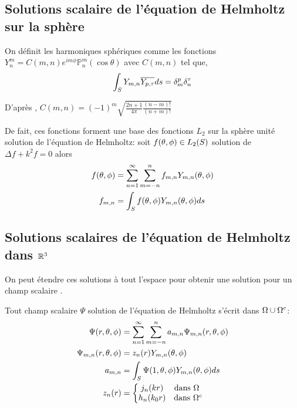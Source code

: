 \subsection{Solutions scalaire de l'équation de Helmholtz sur la sphère}

On définit les harmoniques sphériques comme les fonctions $Y_n^m = C(m,n) e^{im\phi}\mathbb{P}^m_n(\cos \theta) $ avec $C(m,n)$ tel que,
\[
 \displaystyle\int_S Y_{m,n} {\overline{Y_{p,\tau}}} ds = \delta_m^p \delta_n^\tau
\]

D’après \cite[p.~24]{nedelec_acoustic_2001}, $ C(m,n) = (-1)^m\sqrt{\frac{2n+1}{4\pi}\frac{(n-m)!}{(n+m)!}}$

De fait, ces fonctions forment une base des fonctions $L_2$ sur la sphère unité solution de l'équation de Helmholtz: soit $f(\theta,\phi) \in L_2(S)$ solution de $ \Delta f + k^2 f = 0 $ alors
  \begin{align}
    f(\theta,\phi) &= \sum\limits_{n=1}^\infty\sum\limits_{m=-n}^n f_{m,n} Y_{m,n} (\theta,\phi)\\
    \notag f_{m,n} &= \int_S f(\theta,\phi) Y_{m,n}(\theta,\phi) ds
  \end{align}


\subsection{Solutions scalaires de l'équation de Helmholtz dans $\mathbb R^3$}
On peut étendre ces solutions à tout l'espace pour obtenir une solution pour un champ scalaire .

Tout champ scalaire $\Psi$ solution de l'équation de Helmholtz s'écrit dans $\Omega\cup\Omega^c$:
\begin{align} 
\label{eq_helm_sol_helmoltz_scal_somme}
\Psi(r,\theta,\phi) &= \sum\limits_{n=1}^\infty\sum\limits_{m=-n}^n a_{m,n} \Psi_{m,n}(r,\theta,\phi) \\
\Psi_{m,n}(r,\theta,\phi) &= z_n(r) Y_{m,n}(\theta,\phi) \\
\notag a_{m,n} &= \int_S \Psi(1,\theta,\phi) Y_{m,n}(\theta,\phi) ds \\
z_n(r) &= \left\lbrace
  \begin{matrix}
  j_n(kr) &   \text{dans $\Omega~$} \\
  h_n(k_0r) & \text{dans $\Omega^c$} \\
  \end{matrix}\right.
\end{align}
